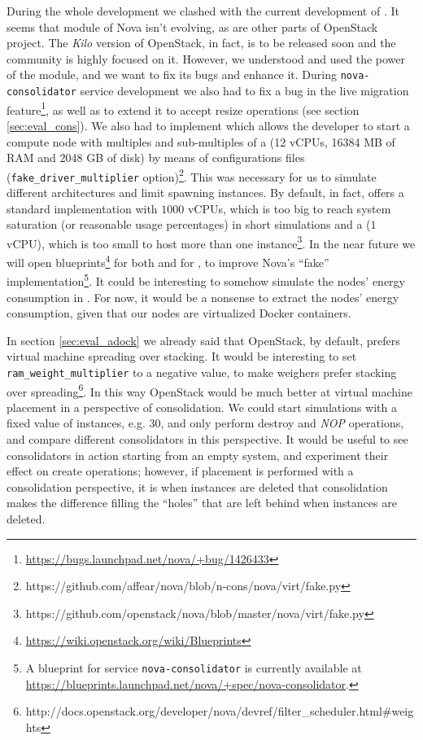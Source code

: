 During the whole development we clashed with the current development of . It seems that  module of Nova isn't evolving, as are other parts of OpenStack project. The \emph{Kilo} version of OpenStack, in fact, is to be released soon and the community is highly focused on it. However, we understood and used the power of the  module, and we want to fix its bugs and enhance it. During \texttt{nova-consolidator} service development we also had to fix a bug in the live migration feature\footnote{\url{https://bugs.launchpad.net/nova/+bug/1426433}}, as well as to extend it to accept resize operations (see section \ref{sec:eval_cons}). We also had to implement  which allows the developer to start a compute node with multiples and sub-multiples of a  (12 vCPUs, 16384 MB of RAM and 2048 GB of disk) by means of configurations files (\texttt{fake\_driver\_multiplier} option)\footnote{https://github.com/affear/nova/blob/n-cons/nova/virt/fake.py}. This was necessary for us to simulate different architectures and limit spawning instances. By default, in fact,  offers a standard implementation with $1000$ vCPUs, which is too big to reach system saturation (or reasonable usage percentages) in short simulations and a  ($1$ vCPU), which is too small to host more than one instance\footnote{https://github.com/openstack/nova/blob/master/nova/virt/fake.py}. In the near future we will open blueprints\footnote{\url{https://wiki.openstack.org/wiki/Blueprints}} for both  and for , to improve Nova's ``fake'' implementation\footnote{A blueprint for service \texttt{nova-consolidator} is currently available at \url{https://blueprints.launchpad.net/nova/+spec/nova-consolidator}.}. It could be interesting to somehow simulate the nodes' energy consumption in . For now, it would be a nonsense to extract the nodes' energy consumption, given that our nodes are virtualized Docker containers.

In section \ref{sec:eval_adock} we already said that OpenStack, by default, prefers virtual machine spreading over stacking. It would be interesting to set \texttt{ram\_weight\_multiplier} to a negative value, to make weighers prefer stacking over spreading\footnote{http://docs.openstack.org/developer/nova/devref/filter\_scheduler.html\#weights}. In this way OpenStack would be much better at virtual machine placement in a perspective of consolidation. We could start simulations with a fixed value of instances, e.g. $30$, and only perform destroy and \textit{NOP} operations, and compare different consolidators in this perspective. It would be useful to see consolidators in action starting from an empty system, and experiment their effect on create operations; however, if placement is performed with a consolidation perspective, it is when instances are deleted that consolidation makes the difference filling the ``holes'' that are left behind when instances are deleted.
